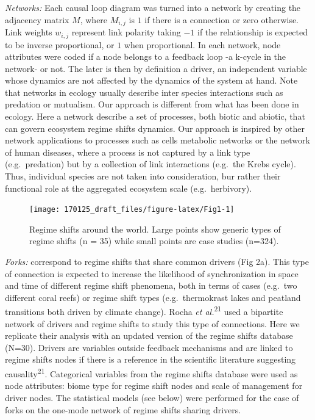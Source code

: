 \documentclass[9pt,]{article}
\begin{document}
\emph{Networks:} Each causal loop diagram was turned into a network by
creating the adjacency matrix \(M\), where \(M_{i,j}\) is \(1\) if there
is a connection or zero otherwise. Link weights \(w_{i,j}\) represent
link polarity taking \(-1\) if the relationship is expected to be
inverse proportional, or \(1\) when proportional. In each network, node
attributes were coded if a node belongs to a feedback loop -a k-cycle in
the network- or not. The later is then by definition a driver, an
independent variable whose dynamics are not affected by the dynamics of
the system at hand. Note that networks in ecology usually describe inter
species interactions such as predation or mutualism. Our approach is
different from what has been done in ecology. Here a network describe a
set of processes, both biotic and abiotic, that can govern ecosystem
regime shifts dynamics. Our approach is inspired by other network
applications to processes such as cells metabolic networks or the
network of human diseases, where a process is not captured by a link
type (e.g.~predation) but by a collection of link interactions (e.g.~the
Krebs cycle). Thus, individual species are not taken into consideration,
bur rather their functional role at the aggregated ecosystem scale
(e.g.~herbivory).

\begin{figure}

{\centering \texttt{[image: 170125\_draft\_files/figure-latex/Fig1-1]} 

}

\caption{Regime shifts around the world. Large points show generic types of regime shifts (n = 35) while small points are case studies (n=324).}\label{fig:Fig1}
\end{figure}

\emph{Forks:} correspond to regime shifts that share common drivers (Fig
2a). This type of connection is expected to increase the likelihood of
synchronization in space and time of different regime shift phenomena,
both in terms of cases (e.g.~two different coral reefs) or regime shift
types (e.g.~thermokrast lakes and peatland transitions both driven by
climate change). Rocha \emph{et al.}\textsuperscript{21} used a
bipartite network of drivers and regime shifts to study this type of
connections. Here we replicate their analysis with an updated version of
the regime shifts database (N=30). Drivers are variables outside
feedback mechanisms and are linked to regime shifts nodes if there is a
reference in the scientific literature suggesting
causality\textsuperscript{21}. Categorical variables from the regime
shifts database were used as node attributes: biome type for regime
shift nodes and scale of management for driver nodes. The statistical
models (see below) were performed for the case of forks on the one-mode
network of regime shifts sharing drivers.
\end{document}
